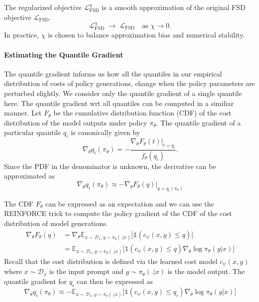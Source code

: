The regularized objective $\mathcal{L}_{\mathrm{FSD}}^{\chi}$ is a smooth approximation of the original FSD objective $\mathcal{L}_{\mathrm{FSD}}$.
\[
  \mathcal{L}_{\mathrm{FSD}}^{\chi}
  \;\longrightarrow\;
  \mathcal{L}_{\mathrm{FSD}}
  \quad \text{as } \chi \to 0.
\]
In practice, $\chi$ is chosen to balance approximation bias and numerical stability.

\paragraph{Estimating the Quantile Gradient} The quantile gradient informs us how all the quantiles in our empirical distribution of costs of policy generations, change when the policy parameters are perturbed slightly. We consider only the quantile gradient of a single quantile here. The quantile gradient wrt all quantiles can be computed in a similiar manner. Let $F_{\theta}$ be the cumulative distribution function (CDF) of the cost distribution of the model outputs under policy $\pi_{\theta}$. The quantile gradient of a particular quantile $q_i$ is canonically given by $$\nabla_\theta q_i(\pi_\theta)= -\frac{\nabla_\theta F_\theta(t)\vert_{t=q_i}}{f_\theta(q_i)}.$$ Since the PDF in the denominator is unknown, the derivative can be approximated as \citep{li2024tiltedquantilegradientupdates}
\begin{equation}
  \nabla_{\theta} q_{i}(\pi_{\theta}) \approx -\nabla_{\theta} F_{\theta}(q) \Big\vert_{q = q_{i}(\pi_{\theta})}
\end{equation}

The CDF $F_{\theta}$ can be expressed as an expectation and we can use the REINFORCE trick \citep{williams1992simple} to compute the policy gradient of the CDF of the cost distribution of model generations.
\begin{align}
  \nabla_{\theta} F_{\theta}(q) &= \nabla_{\theta} \mathbb{E}_{x \sim \mathcal{D}_{x}, y \sim \pi_{\theta}(. \vert x)} \Big[ \mathds{1}(c_{\psi}(x,y) \leq q)\Big] \\
  &= \mathbb{E}_{x \sim \mathcal{D}_{x}, y \sim \pi_{\theta}(. \vert x)} \Big[ \mathds{1}(c_{\psi}(x,y) \leq q) \nabla_{\theta} \log \pi_{\theta}(y \vert x)\Big]
\end{align}
Recall that the cost distribution is defined via the learned cost model $c_{\psi}(x,y)$ where $x \sim \mathcal{D}_{x}$ is the input prompt and $y \sim \pi_{\theta}(. \vert x)$ is the model output. The quantile gradient for $q_i$ can then be expressed as
\begin{equation}
  \nabla_{\theta} q_{i}(\pi_{\theta}) \approx -\mathbb{E}_{x \sim \mathcal{D}_{x}, y \sim \pi_{\theta}(. \vert x)} \Big[ \mathds{1}(c_{\psi}(x,y) \leq q_i) \nabla_{\theta} \log \pi_{\theta}(y \vert x)\Big]
  \label{eq:quantile-gradient}
\end{equation}

